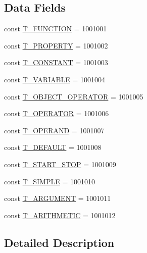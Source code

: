 \subsection*{\-Data \-Fields}
\begin{DoxyCompactItemize}
\item 
const \hyperlink{class_p_h_p_linq___linq_to_zend_db_a4192d08dd8d82121af30543fe4e2e5b6}{\-T\-\_\-\-F\-U\-N\-C\-T\-I\-O\-N} = 1001001
\item 
const \hyperlink{class_p_h_p_linq___linq_to_zend_db_a04b1602fd136fe6c029b0f2affc8430e}{\-T\-\_\-\-P\-R\-O\-P\-E\-R\-T\-Y} = 1001002
\item 
const \hyperlink{class_p_h_p_linq___linq_to_zend_db_a407454bd827c0d0832ff40ce6152f6da}{\-T\-\_\-\-C\-O\-N\-S\-T\-A\-N\-T} = 1001003
\item 
const \hyperlink{class_p_h_p_linq___linq_to_zend_db_a50c0f2c8842d4f6810d2671441c86762}{\-T\-\_\-\-V\-A\-R\-I\-A\-B\-L\-E} = 1001004
\item 
const \hyperlink{class_p_h_p_linq___linq_to_zend_db_a3bc84c65cef799e9add55bcc7ed2e829}{\-T\-\_\-\-O\-B\-J\-E\-C\-T\-\_\-\-O\-P\-E\-R\-A\-T\-O\-R} = 1001005
\item 
const \hyperlink{class_p_h_p_linq___linq_to_zend_db_a6db1d331d997489d26336f89463851da}{\-T\-\_\-\-O\-P\-E\-R\-A\-T\-O\-R} = 1001006
\item 
const \hyperlink{class_p_h_p_linq___linq_to_zend_db_ac30013db51ceadb92cf33a55e08458b7}{\-T\-\_\-\-O\-P\-E\-R\-A\-N\-D} = 1001007
\item 
const \hyperlink{class_p_h_p_linq___linq_to_zend_db_a789fc10f375b2c34f478fb0dd631471c}{\-T\-\_\-\-D\-E\-F\-A\-U\-L\-T} = 1001008
\item 
const \hyperlink{class_p_h_p_linq___linq_to_zend_db_ad11ed6bc65e0073b4c70fc62ed348414}{\-T\-\_\-\-S\-T\-A\-R\-T\-\_\-\-S\-T\-O\-P} = 1001009
\item 
const \hyperlink{class_p_h_p_linq___linq_to_zend_db_ae326875c3ba0aa2b644725265540cdc3}{\-T\-\_\-\-S\-I\-M\-P\-L\-E} = 1001010
\item 
const \hyperlink{class_p_h_p_linq___linq_to_zend_db_af7e4254e6c1f911e3b98ed63542fe631}{\-T\-\_\-\-A\-R\-G\-U\-M\-E\-N\-T} = 1001011
\item 
const \hyperlink{class_p_h_p_linq___linq_to_zend_db_a8a93833c2dc584cba2c355f41f301a74}{\-T\-\_\-\-A\-R\-I\-T\-H\-M\-E\-T\-I\-C} = 1001012
\end{DoxyCompactItemize}


\subsection{\-Detailed \-Description}


